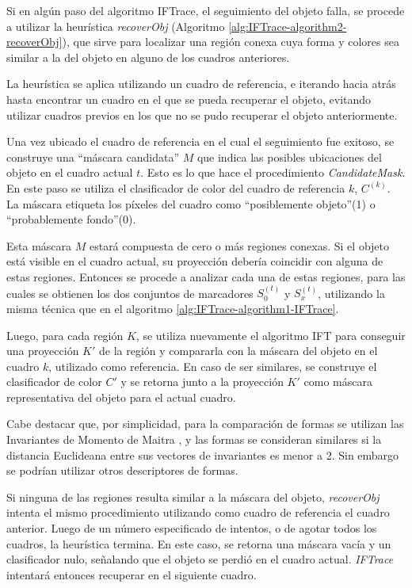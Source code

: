 \documentclass[a4paper,10pt]{article}
\begin{document}
Si en algún paso del algoritmo IFTrace, el seguimiento del objeto falla, se
procede a utilizar la heurística \textit{recoverObj} (Algoritmo
\ref{alg:IFTrace-algorithm2-recoverObj}), que sirve para localizar una región
conexa cuya forma y colores sea similar a la del objeto en alguno de los
cuadros anteriores.

La heurística se aplica utilizando un cuadro de referencia, e iterando hacia atrás
hasta encontrar un cuadro en el que se pueda recuperar el objeto, evitando
utilizar cuadros previos en los que no se pudo recuperar el objeto anteriormente.

Una vez ubicado el cuadro de referencia en el cual el seguimiento fue exitoso,
se construye una ``máscara candidata'' $M$ que indica las posibles ubicaciones
del objeto en el cuadro actual $t$. Esto es lo que hace el procedimiento \textit{CandidateMask}.
En este paso se
utiliza el clasificador de color del cuadro de referencia $k$, $C^{(k)}$. La máscara
etiqueta los píxeles del cuadro como ``posiblemente objeto''(1) o
``probablemente fondo''(0).

Esta máscara $M$ estará compuesta de cero
o más regiones conexas. Si el objeto está visible en el cuadro actual,
su proyección debería coincidir con alguna de estas regiones. Entonces
se procede a analizar cada una de estas regiones, para las cuales se obtienen
los dos conjuntos de marcadores $S_{0}^{(t)}$ y $S_{x}^{(t)}$, utilizando la misma técnica que en el
algoritmo \ref{alg:IFTrace-algorithm1-IFTrace}.

 Luego, para cada región $K$, se utiliza
nuevamente el algoritmo IFT para conseguir una proyección $K'$ de la región
y compararla con la máscara del objeto en el cuadro
$k$, utilizado como referencia. En caso de ser similares, se construye el clasificador
de color $C'$ y se retorna junto a la proyección $K'$ como máscara representativa
del objeto para el actual cuadro.

Cabe destacar que, por simplicidad, para la comparación de formas se utilizan
las Invariantes de Momento de Maitra \cite{MaitraMomentInvariants}, y las formas se consideran similares
si la distancia Euclideana entre sus vectores de invariantes es menor a 2.
Sin embargo se podrían utilizar otros descriptores de formas.

Si ninguna de las regiones resulta similar a la máscara del objeto,
\textit{recoverObj} intenta el mismo procedimiento utilizando como cuadro de
referencia el cuadro anterior. Luego de un número especificado de intentos, o
de agotar todos los cuadros, la heurística termina. En este caso, se retorna
una máscara vacía y un clasificador nulo, señalando que el objeto se perdió en
el cuadro actual. \textit{IFTrace} intentará entonces recuperar en el siguiente
cuadro.
\end{document}

